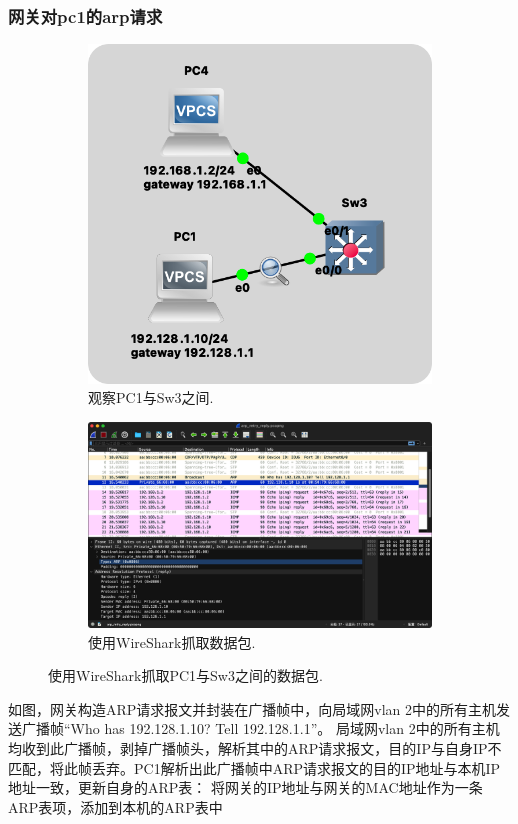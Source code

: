 \documentclass[a4paper,12pt]{report}
\begin{document}
\begin{spacing}{1.5}
\subsubsection{网关对pc1的arp请求}
\begin{figure}[h!]
  \centering
  \begin{subfigure}[b]{0.3\linewidth}
    \includegraphics[width=\linewidth]{figure/168.png}
    \caption{观察PC1与Sw3之间.}
  \end{subfigure}
  \begin{subfigure}[b]{0.6\linewidth}
    \includegraphics[width=\linewidth]{figure/128_retry_arp.png}
    \caption{使用WireShark抓取数据包.}
  \end{subfigure}
  \caption{使用WireShark抓取PC1与Sw3之间的数据包.}
  \label{fig:128}
\end{figure}
如图，网关构造ARP请求报文并封装在广播帧中，向局域网vlan 2中的所有主机发送广播帧“Who has 192.128.1.10? Tell 192.128.1.1”。
局域网vlan 2中的所有主机均收到此广播帧，剥掉广播帧头，解析其中的ARP请求报文，目的IP与自身IP不匹配，将此帧丢弃。PC1解析出此广播帧中ARP请求报文的目的IP地址与本机IP地址一致，更新自身的ARP表：
将网关的IP地址与网关的MAC地址作为一条ARP表项，添加到本机的ARP表中


\end{spacing}
\end{document}

